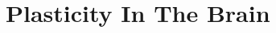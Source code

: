 \documentclass[main]{subfiles}
\begin{document}
\newpage
\section{Plasticity In The Brain}
\end{document}
